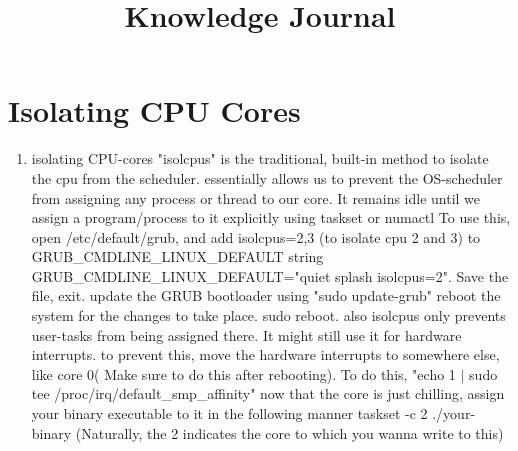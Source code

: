 \title{   Knowledge Journal   } \maketitle \tableofcontents





\clearpage\section{ Isolating CPU Cores }


\begin{enumerate}

\item isolating CPU-cores                                                                                                                                                     
    \tab "isolcpus" is the traditional, built-in method to isolate the cpu from the scheduler.                                                                                     \tab essentially allows us to prevent the OS-scheduler from assigning any process or thread to our core.                                                                  
    \tab It remains idle until we assign a program/process to it explicitly using taskset or numactl                                                                          
    \tab To use this, open /etc/default/grub, and add isolcpus=2,3 (to isolate cpu 2 and 3) to GRUB_CMDLINE_LINUX_DEFAULT string                                              
    \tab GRUB_CMDLINE_LINUX_DEFAULT="quiet splash isolcpus=2". Save the file, exit.    
    \tab update the GRUB bootloader using "sudo update-grub"                                                                                                   
    \tab reboot the system for the changes to take place. sudo reboot.                                                                                                    
    \tab also isolcpus only prevents user-tasks from being assigned there. It might still use it for hardware interrupts.                                     
    \tab to prevent this, move the hardware interrupts to somewhere else, like core 0( Make sure to do this after rebooting). 
    \tab To do this, "echo 1 $\vert$ sudo tee /proc/irq/default_smp_affinity"
    \tab now that the core is just chilling, assign your binary executable to it in the following manner                                                       
    \tab taskset -c 2 ./your-binary (Naturally, the 2 indicates the core to which you wanna write to this)
                                                                                                                                                                             

\end{enumerate}
